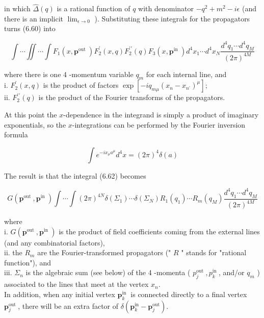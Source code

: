 \documentclass[10pt, letterpaper]{article}
\begin{document}
in which $\widehat{\Delta}(q)$ is a rational function of $q$ with denominator $-q^{2}+m^{2}-i \epsilon$ (and there is an implicit $\lim _{\epsilon \rightarrow 0}$ ). Substituting these integrals for the propagators turns (6.60) into

$$
\int \cdots \iint \cdots \int F_{1}\left(x, \mathbf{p}^{\text {out }}\right) F_{2}^{\prime}(x, q) F_{2}^{\prime \prime}(q) F_{3}\left(x, \mathbf{p}^{\text {in }}\right) d^{4} x_{1} \cdots d^{4} x_{N} \frac{d^{4} q_{1} \cdots d^{4} q_{M}}{(2 \pi)^{4 M}}
$$

where there is one 4 -momentum variable $q_{m}$ for each internal line, and\\
i. $F_{2}^{\prime}(x, q)$ is the product of factors $\exp \left[-i q_{m \mu}\left(x_{n}-x_{n^{\prime}}\right)^{\mu}\right]$;\\
ii. $F_{2}^{\prime \prime}(q)$ is the product of the Fourier transforms of the propagators.

At this point the $x$-dependence in the integrand is simply a product of imaginary exponentials, so the $x$-integrations can be performed by the Fourier inversion formula

$$
\int e^{-i x_{\mu} a^{\mu}} d^{4} x=(2 \pi)^{4} \delta(a)
$$

The result is that the integral (6.62) becomes

$$
G\left(\mathbf{p}^{\text {out }}, \mathbf{p}^{\text {in }}\right) \int \cdots \int(2 \pi)^{4 N} \delta\left(\Sigma_{1}\right) \cdots \delta\left(\Sigma_{N}\right) R_{1}\left(q_{1}\right) \cdots R_{m}\left(q_{M}\right) \frac{d^{4} q_{1} \cdots d^{4} q_{M}}{(2 \pi)^{4 M}}
$$

where\\
i. $G\left(\mathbf{p}^{\text {out }}, \mathbf{p}^{\text {in }}\right)$ is the product of field coefficients coming from the external lines (and any combinatorial factors),\\
ii. the $R_{m}$ are the Fourier-transformed propagators (" $R$ " stands for "rational function"), and\\
iii. $\Sigma_{n}$ is the algebraic sum (see below) of the 4 -momenta ( $p_{j}^{\text {out }}, p_{k}^{\text {in }}$, and/or $q_{m}$ ) associated to the lines that meet at the vertex $x_{n}$.\\
In addition, when any initial vertex $\mathbf{p}_{k}^{\text {in }}$ is connected directly to a final vertex $\mathbf{p}_{j}^{\text {out }}$, there will be an extra factor of $\delta\left(\mathbf{p}_{k}^{\mathrm{in}}-\mathbf{p}_{j}^{\mathrm{out}}\right)$.
\end{document}
